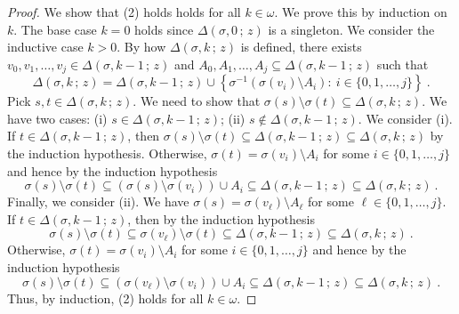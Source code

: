 \documentclass[10pt,a4paper, openany,  oldfontcommands]{memoir}
\newtheorem{open problem} [theorem] {Open Problem}
\begin{document}
\begin{proof}
We show that (2) holds   holds for all $ k   \in  \omega   $. 
We prove this by induction on $k$. 
The base case $k= 0 $  holds since   $   \Delta \left(  \sigma , 0  \,  ;   \,   z  \right)   $  is a singleton. 
We consider the inductive case  $  k >  0  $. 
By how  $   \Delta \left(  \sigma , k  \,  ;   \,   z  \right)   $  is defined,  there exists 
 $  v_0,  v_1,  \ldots ,  v_j  \in   \Delta \left(  \sigma , k-1  \,  ;   \,   z  \right)    $  
 and  $  A_0,  A_1,  \ldots , A_j  \subseteq    \Delta \left(  \sigma , k-1  \,  ;   \,   z  \right)  $  such that  
 \[
 \Delta \left(  \sigma , k  \,  ;   \,   z  \right)  =   \Delta \left(  \sigma , k-1  \,  ;   \,   z  \right)     \cup   
 \left\{
     \sigma^{ -1}   \left(      \sigma ( v_i )  \setminus   A_i   \right)     :    \     i  \in  \lbrace 0, 1,  \ldots  ,  j  \rbrace 
 \right\}
 \      .
 \]
Pick  $  s,  t   \in  \Delta \left(  \sigma , k  \,  ;   \,   z  \right) $.
We need to show that 
 $  \sigma (s)  \setminus  \sigma (t)   \subseteq       \Delta \left(  \sigma , k   \,  ;   \,   z  \right)    $.
 We have two cases:
  (i)  $  s  \in   \Delta \left(  \sigma , k-1  \,  ;   \,   z  \right) $; 
  (ii)  $  s  \not\in   \Delta \left(  \sigma , k-1  \,  ;   \,   z  \right) $. 
  We consider (i). 
  If  $  t  \in   \Delta \left(  \sigma , k-1  \,  ;   \,   z  \right)   $, 
  then   $  \sigma (s)  \setminus  \sigma (t)    \subseteq   \Delta \left(  \sigma , k-1  \,  ;   \,   z  \right)    \subseteq       \Delta \left(  \sigma , k   \,  ;   \,   z  \right)    $
  by the induction hypothesis. 
  Otherwise, $   \sigma (t)  =    \sigma ( v_i )  \setminus   A_i   $  for some  $  i  \in    \lbrace 0, 1,  \ldots  ,  j  \rbrace   $ 
  and hence  by the induction hypothesis 
  \[
    \sigma (s)  \setminus  \sigma (t)        \subseteq   
    \left(       \sigma (s)  \setminus \sigma ( v_i )       \right)    \cup  A_i 
    \subseteq   \Delta \left(  \sigma , k-1  \,  ;   \,   z  \right)    \subseteq       \Delta \left(  \sigma , k   \,  ;   \,   z  \right)  
    \      .
  \]
Finally,  we consider (ii). 
We have  $  \sigma (s)  =    \sigma ( v_{  \ell}   )  \setminus   A_{  \ell  }   $  for some  $  \ell  \in    \lbrace 0, 1,  \ldots  ,  j  \rbrace   $. 
If  $  t   \in    \Delta \left(  \sigma , k-1  \,  ;   \,   z  \right)   $,  then    by the induction hypothesis 
  \[
    \sigma (s)  \setminus  \sigma (t)        \subseteq        \sigma ( v_{  \ell}   )   \setminus \sigma ( t )    
    \subseteq   \Delta \left(  \sigma , k-1  \,  ;   \,   z  \right)    \subseteq       \Delta \left(  \sigma , k   \,  ;   \,   z  \right)  
    \      .
  \]
Otherwise,   $   \sigma (t)  =    \sigma ( v_i )  \setminus   A_i   $  for some  $  i  \in    \lbrace 0, 1,  \ldots  ,  j  \rbrace   $ 
  and hence  by the induction hypothesis 
  \[
    \sigma (s)  \setminus  \sigma (t)        \subseteq       
    \left(   \sigma ( v_{  \ell}   )   \setminus  \sigma ( v_i )      \right)    \cup   A_i 
    \subseteq   \Delta \left(  \sigma , k-1  \,  ;   \,   z  \right)    \subseteq       \Delta \left(  \sigma , k   \,  ;   \,   z  \right)  
    \      .
  \]  
Thus, by induction,  (2)  holds for all $ k  \in  \omega  $. 






\end{proof}
\end{document}
